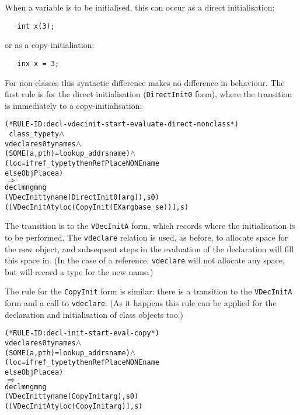 \documentclass[11pt]{article}
\begin{document}
When a variable is to be initialised, this can occur as a direct
initialisation:
\begin{verbatim}
   int x(3);
\end{verbatim}
or as a copy-initialiation:
\begin{verbatim}
   inx x = 3;
\end{verbatim}
%
For non-classes this syntactic difference makes no difference in
behaviour.  The first rule is for the direct initialisation
(\texttt{DirectInit0} form), where the transition is immediately to a
copy-initialisation:
\begin{center}
\begin{minipage}{\textwidth}
\begin{alltt}
(* RULE-ID: decl-vdecinit-start-evaluate-direct-nonclass *)
     ~class_type ty \(\land\)
     vdeclare s0 ty name s \(\land\)
     (SOME (a,pth) = lookup_addr s name) \(\land\)
     (loc = if ref_type ty then RefPlace NONE name 
            else ObjPlace a)
   \(\Rightarrow\)
     declmng mng
             (VDecInit ty name (DirectInit0 [arg]), s0)
             ([VDecInitA ty loc (CopyInit (EX arg base_se))], s)
\end{alltt}
\end{minipage}
\end{center}
%
%
The transition is to the \texttt{VDecInitA} form, which records where
the initialisation is to be performed.  The \texttt{vdeclare} relation
is used, as before, to allocate space for the new object, and
subsequent steps in the evaluation of the declaration will fill this
space in.  (In the case of a reference, \texttt{vdeclare} will not
allocate any space, but will record a type for the new name.)

%
The rule for the \texttt{CopyInit} form is similar: there is a
transition to the \texttt{VDecInitA} form and a call to
\texttt{vdeclare}. (As it happens this rule can be applied for the
declaration and initialisation of class objects too.)
\begin{center}
\begin{minipage}{\textwidth}
%
\begin{alltt}
(* RULE-ID: decl-init-start-eval-copy *)
     vdeclare s0 ty name s \(\land\)
     (SOME (a,pth) = lookup_addr s name) \(\land\)
     (loc = if ref_type ty then RefPlace NONE name 
            else ObjPlace a)
   \(\Rightarrow\)
     declmng mng
             (VDecInit ty name (CopyInit arg), s0)
             ([VDecInitA ty loc (CopyInit arg)], s)
\end{alltt}
\end{minipage}
\end{center}
\end{document}
